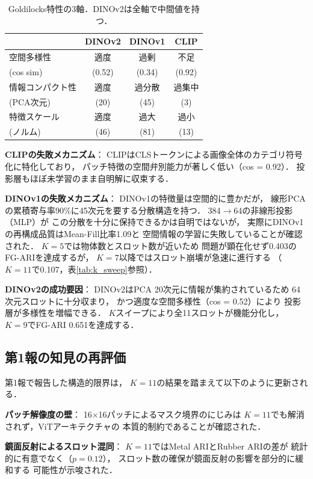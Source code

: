 \documentclass[dvipdfmx,twocolumn]{jarticle}
\begin{document}
\begin{table}[t]
\centering
\caption{Goldilocks特性の3軸．DINOv2は全軸で中間値を持つ．}
\label{tab:goldilocks}
\small
\begin{tabular}{p{2.2cm}ccc}
\toprule
 & DINOv2 & DINOv1 & CLIP \\
\midrule
空間多様性 & 適度 & 過剰 & 不足 \\
(cos sim) & (0.52) & (0.34) & (0.92) \\
\midrule
情報コンパクト性 & 適度 & 過分散 & 過集中 \\
(PCA次元) & (20) & (45) & (3) \\
\midrule
特徴スケール & 適度 & 過大 & 過小 \\
(ノルム) & (46) & (81) & (13) \\
\bottomrule
\end{tabular}
\end{table}

\textbf{CLIPの失敗メカニズム}：
CLIPはCLSトークンによる画像全体のカテゴリ符号化に特化しており，
パッチ特徴の空間弁別能力が著しく低い（cos = 0.92）．
投影層もほぼ未学習のまま自明解に収束する．

\textbf{DINOv1の失敗メカニズム}：
DINOv1の特徴量は空間的に豊かだが，
線形PCAの累積寄与率90\%に45次元を要する分散構造を持つ．
384$\to$64の非線形投影（MLP）が
この分散を十分に保持できるかは自明ではないが，
実際にDINOv1の再構成品質はMean-Fill比率1.09と
空間情報の学習に失敗していることが確認された．
$K{=}5$では物体数とスロット数が近いため
問題が顕在化せず0.403のFG-ARIを達成するが，
$K{=}7$以降ではスロット崩壊が急速に進行する
（$K{=}11$で0.107，表\ref{tab:k_sweep}参照）．

\textbf{DINOv2の成功要因}：
DINOv2はPCA 20次元に情報が集約されているため
64次元スロットに十分収まり，
かつ適度な空間多様性（cos = 0.52）により
投影層が多様性を増幅できる．
$K$スイープにより全11スロットが機能分化し，
$K{=}9$でFG-ARI 0.651を達成する．

\subsection{第1報の知見の再評価}

第1報で報告した構造的限界は，
$K{=}11$の結果を踏まえて以下のように更新される．

\textbf{パッチ解像度の壁}：
16$\times$16パッチによるマスク境界のにじみは
$K{=}11$でも解消されず，ViTアーキテクチャの
本質的制約であることが確認された．

\textbf{鏡面反射によるスロット混同}：
$K{=}11$ではMetal ARIとRubber ARIの差が
統計的に有意でなく（$p{=}0.12$），
スロット数の確保が鏡面反射の影響を部分的に緩和する
可能性が示唆された．
\end{document}
